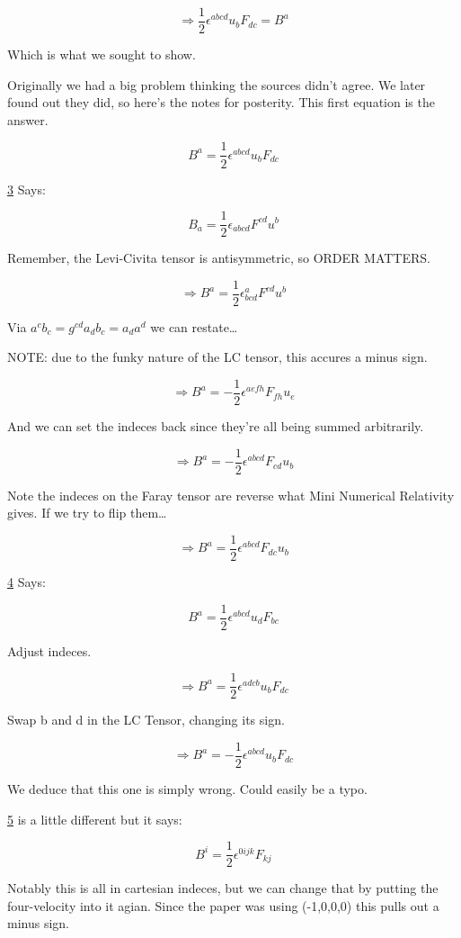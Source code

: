 \documentclass[landscape,letterpaper,10pt,english]{article}
\begin{document}
\[ \Rightarrow \frac12 \epsilon^{abcd}u_bF_{dc} =  B^a \]

Which is what we sought to show.

    Originally we had a big problem thinking the sources didn't agree. We
later found out they did, so here's the notes for posterity. This first
equation is the answer.

\[ B^a = \frac12 \epsilon^{abcd}u_bF_{dc} \]

\hyperref[3]{3} Says:

\[ B_a = \frac12 \epsilon_{abcd} F^{cd} u^b \]

Remember, the Levi-Civita tensor is antisymmetric, so ORDER MATTERS.

\[ \Rightarrow B^a = \frac12 \epsilon^a_{bcd} F^{cd} u^b \]

Via \(a^cb_c = g^{cd} a_db_c = a_da^d\) we can restate\ldots{}

NOTE: due to the funky nature of the LC tensor, this accures a minus
sign.

\[ \Rightarrow B^a = - \frac12 \epsilon^{aefh} F_{fh} u_e \]

And we can set the indeces back since they're all being summed
arbitrarily.

\[ \Rightarrow B^a = - \frac12 \epsilon^{abcd} F_{cd} u_b \]

Note the indeces on the Faray tensor are reverse what Mini Numerical
Relativity gives. If we try to flip them\ldots{}

\[ \Rightarrow B^a = \frac12 \epsilon^{abcd} F_{dc} u_b \]

\hyperref[4]{4} Says:

\[ B^a = \frac12 \epsilon^{abcd}u_dF_{bc} \]

Adjust indeces.

\[ \Rightarrow B^a = \frac12 \epsilon^{adcb}u_bF_{dc} \]

Swap b and d in the LC Tensor, changing its sign.

\[ \Rightarrow B^a = -\frac12 \epsilon^{abcd}u_bF_{dc} \]

We deduce that this one is simply wrong. Could easily be a typo.

\hyperref[5]{5} is a little different but it says:

\[ B^i = \frac12 \epsilon^{0ijk} F_{kj} \]

Notably this is all in cartesian indeces, but we can change that by
putting the four-velocity into it agian. Since the paper was using
(-1,0,0,0) this pulls out a minus sign.
\end{document}

